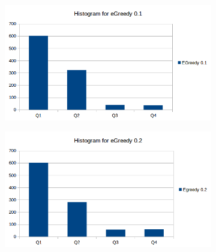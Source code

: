 \documentclass[a4paper, 11pt]{article}
\begin{document}
\begin{figure}[H]
\begin{subfigure}{.5\textwidth}
  \centering
  \includegraphics[width=1\linewidth]{ex1_2_histogram_egreedy01}
\end{subfigure}%
\begin{subfigure}{.5\textwidth}
  \centering
  \includegraphics[width=1\linewidth]{ex1_2_histogram_egreedy02}
\end{subfigure}%


\end{figure}
\end{document}
